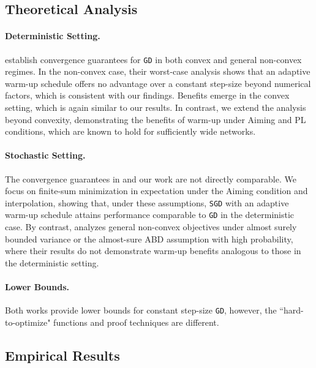 \documentclass[a4paper,11pt]{article}
\newcommand{\algname}[1]{\texttt{#1}}
\newcommand{\1}{\mathbbm{1}}
\theoremstyle{plain}
\begin{document}
\subsection{Theoretical Analysis}

\paragraph{Deterministic Setting.} \citet{liu2025theoretical} establish convergence guarantees for \algname{GD} in both convex and general non-convex regimes. In the non-convex case, their worst-case analysis shows that an adaptive warm-up schedule offers no advantage over a constant step-size beyond numerical factors, which is consistent with our findings. Benefits emerge in the convex setting, which is again similar to our results. In contrast, we extend the analysis beyond convexity, demonstrating the benefits of warm-up under Aiming and PL conditions, which are known to hold for sufficiently wide networks. 

\paragraph{Stochastic Setting.} The convergence guarantees in \citet{liu2025theoretical} and our work are not directly comparable. We focus on finite-sum minimization in expectation under the Aiming condition and interpolation, showing that, under these assumptions, \algname{SGD} with an adaptive warm-up schedule attains performance comparable to \algname{GD} in the deterministic case. By contrast, \citet{liu2025theoretical} analyzes general non-convex objectives under almost surely bounded variance or the almost-sure ABD assumption \citep{khaled2020better} with high probability, where their results do not demonstrate warm-up benefits analogous to those in the deterministic setting. 

\paragraph{Lower Bounds.} Both works provide lower bounds for constant step-size \algname{GD}, however, the ``hard-to-optimize" functions and proof techniques are different. 

\subsection{Empirical Results} 
\end{document}
